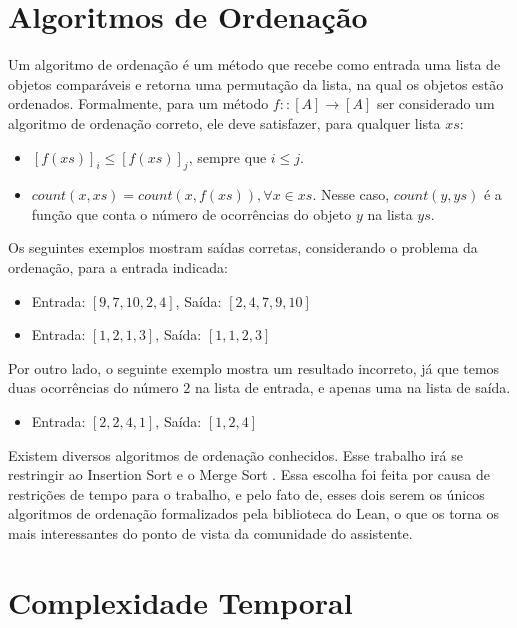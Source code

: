 \documentclass[12pt, oneside, a4paper,english,brazil]{abntex2}
\begin{document}
\section{Algoritmos de Ordena\c{c}\~ao}
\qquad Um algoritmo de ordena\c{c}\~ao \'e um m\'etodo que recebe como entrada uma lista de objetos
compar\'aveis e retorna uma permuta\c{c}\~ao da lista, na qual os objetos est\~ao ordenados. Formalmente,
para um m\'etodo $f :: [A] \rightarrow [A]$ ser considerado um algoritmo de ordena\c{c}\~ao correto, ele deve
satisfazer, para qualquer lista $xs$:

\begin{itemize}
  \item $[f(xs)]_{i} \le [f(xs)]_{j}$, sempre que $i \le j$.
  \item $count(x, xs) = count(x, f(xs)) ,  \forall x \in xs$. Nesse caso, $count(y, ys)$ \'e a fun\c{c}\~ao
        que conta o n\'umero de ocorr\^encias do objeto $y$ na lista $ys$.
\end{itemize}

\qquad Os seguintes exemplos mostram sa\'idas corretas, considerando o problema da ordena\c{c}\~ao, para a
entrada indicada:

\begin{itemize}
  \item Entrada: $[9, 7, 10, 2, 4]$, Sa\'ida: $[2, 4, 7, 9, 10]$
  \item Entrada: $[1, 2, 1, 3]$, Sa\'ida: $[1, 1, 2, 3]$
\end{itemize}

\qquad Por outro lado, o seguinte exemplo mostra um resultado incorreto, j\'a que temos duas ocorr\^encias
do n\'umero $2$ na lista de entrada, e apenas uma na lista de sa\'ida.

\begin{itemize}
  \item Entrada: $[2, 2, 4, 1]$, Sa\'ida: $[1, 2, 4]$
\end{itemize}

\qquad Existem diversos algoritmos de ordena\c{c}\~ao conhecidos. Esse trabalho ir\'a se restringir ao
Insertion Sort e o Merge Sort \cite{1}. Essa escolha foi feita por causa de restri\c{c}\~oes de tempo para
o trabalho, e pelo fato de, esses dois serem os \'unicos algoritmos de ordena\c{c}\~ao
formalizados pela biblioteca do Lean, o que os torna os mais interessantes do ponto de vista
da comunidade do assistente.

\section{Complexidade Temporal}
\end{document}

